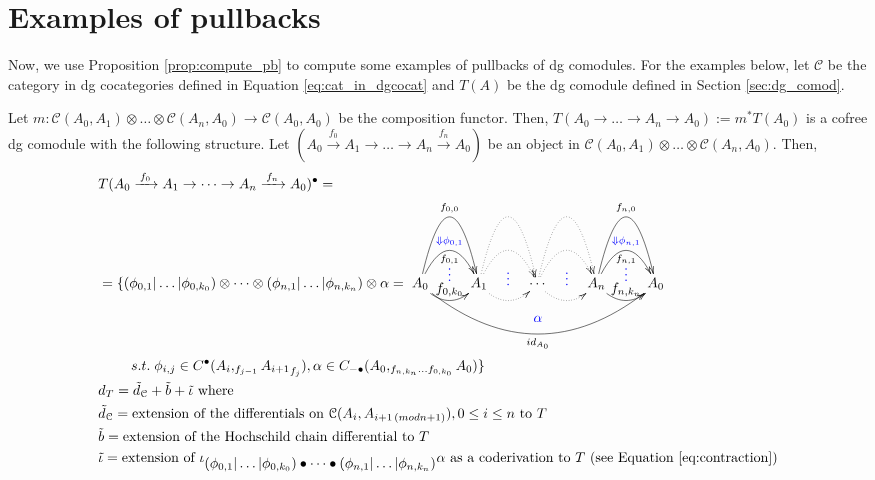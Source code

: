 \section{Examples of pullbacks}\label{sec:pb_example}
%
Now, we use Proposition \ref{prop:compute_pb} 
to compute some examples of pullbacks of 
dg comodules. For the examples below, 
let $\mathcal{C}$ 
be the category in dg cocategories defined in 
Equation \ref{eq:cat_in_dgcocat} and $T(A)$ be the 
dg comodule defined in Section \ref{sec:dg_comod}.

\begin{eg} Let $m:\mathcal{C}(A_0,A_1) \otimes 
\dots \otimes \mathcal{C}(A_n, A_0) \to 
\mathcal{C}(A_0,A_0)$ be the composition 
functor. Then, $T(A_0 \to \dots \to A_n \to A_0) 
:= m^*T(A_0)$ is a cofree dg comodule with 
the following structure. Let 
$(A_0 \xrightarrow{f_0} A_1 \to \dots \to 
A_n \xrightarrow{f_n} A_0)$ be an object 
in $\mathcal{C}(A_0,A_1) \otimes \dots \otimes 
\mathcal{C}(A_n, A_0)$. Then,
\begin{align*}
&T(A_0 \xrightarrow{f_0} A_1 \to \dots \to 
A_n \xrightarrow{f_n} A_0)^\bullet = \\
&= \{
  (\phi_{0,1}|\dots|\phi_{0,k_0}) \otimes \dots \otimes
  (\phi_{n,1}|\dots|\phi_{n,k_n}) \otimes \alpha =
  \xymatrix{
  A_0 \ar@/^4pc/[r]^{f_{0,0}} 
  \ar@/^2pc/[r]^{\textcolor{blue}{\Downarrow \phi_{0,1}}}_{f_{0,1}} 
  \ar@/_1pc/[r]^{\substack{\textcolor{blue}{\vdots}\\ f_{0,k_0}}}
  \ar@/_3pc/[rrrr]^{\substack{\textcolor{blue}{\alpha} \\\\}}_{ id_{A_0}}
  & A_1 \ar@{.>}@/^4pc/[r] 
  \ar@{.>}@/^2pc/[r]_{\substack{\\ \\ \textcolor{blue}{\vdots}}} 
  \ar@{.>}@/_1pc/[r]
  & \cdots \ar@{.>}@/^4pc/[r] 
  \ar@{.>}@/^2pc/[r]_{\substack{\\ \\ \textcolor{blue}{\vdots}}} 
  \ar@{.>}@/_1pc/[r]
  & A_n \ar@/^4pc/[r]^{f_{n,0}} 
  \ar@/^2pc/[r]^{\textcolor{blue}{\Downarrow \phi_{n,1}}}_{f_{n,1}} 
  \ar@/_1pc/[r]^{\substack{\textcolor{blue}{\vdots}\\ f_{n,k_n}}}
  & A_0 
  }\\
&\phantom{move}
   s.t.\; \phi_{i,j} \in C^\bullet(A_i, _{f_{j-1}} {A_{i+1}}_{f_j}),
    \alpha \in C_{-\bullet}(A_0, _{f_{n,k_n}\dots f_{0,k_0}} A_0)\}\\
&d_{T} = 
  \tilde{d}_{\mathcal{C}} + \tilde{b} + \tilde{\iota} 
  \textrm{ where}\\
&\tilde{d}_{\mathcal{C}} = 
  \textrm{extension of the differentials on 
  $\mathcal{C}(A_i,A_{i+1 \, (mod n+1)}), 0 \leq i \leq n$ to $T$}\\
&\tilde{b} =
  \textrm{extension of the Hochschild chain differential to $T$}\\
&\tilde{\iota} = 
  \textrm{extension of $\iota_{\scriptstyle (\phi_{0,1}|\dots|\phi_{0,k_0}) 
    \bullet \dots \bullet (\phi_{n,1}|\dots|\phi_{n,k_n})} \alpha$ as a coderivation to $T$ (see Equation \ref{eq:contraction})}
\end{align*}
\end{eg}

